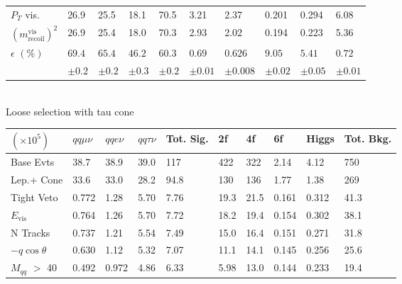 \begin{table}
\begin{tabular}{|p{}|p{}p{}p{}|p{}|p{}p{}p{}p{}|p{}|}
$P_T$ vis. & {26.9 } &  {25.5} &  {18.1} & {70.5} &  {3.21} &  {2.37} &  {0.201} &  {0.294} & 6.08\\ 

$(m^{\text{vis}}_{\text{recoil}})^2$ & {26.9 } &  {25.4 } &  {18.0} & {70.3} &  {2.93} &  {2.02} &  {0.194} &  {0.223} & 5.36 \\ 
\hline 

 $\epsilon \, \, (\%)$ & $69.4 $ & $65.4 $ & $46.2$ &  $60.3 $ & $0.69 $ & $0.626 $ & $9.05 $ & $5.41 $ & $0.72$ \\ 
 
 			& $\pm 0.2$ & $\pm 0.2$ & $\pm 0.3$ & $\pm 0.2$ & $\pm 0.01$ & $\pm 0.008 $& $\pm 0.02$ & $\pm0.05$  & $\pm 0.01$\\
\hline
\end{tabular}
\quad \quad \\
Loose selection with tau cone\\
\begin{tabular}{|p{}|p{}p{}p{}|p{}|p{}p{}p{}p{}|p{}|}
\hline 
 $(\times 10^5)$  & $qq\mu\nu$ & $qqe\nu$ & $qq\tau\nu$ & Tot. Sig. & 2f & 4f & 6f & Higgs & Tot. Bkg. \\ \hline 
Base Evts & {38.7 } &  {38.9 } &  {39.0} & {117} &  {422} &  {322} &  {2.14} &  {4.12} & 750\\ 
 
Lep.+ Cone & {33.6 } &  {33.0 } &  {28.2} & {94.8} &  {130} &  {136} &  {1.77} &  {1.38} & 269\\ 

Tight Veto & {0.772 } &  {1.28 } &  {5.70} & {7.76} &  {19.3} &  {21.5} &  {0.161} &  {0.312} & 41.3 \\ 
 
$E_{\text{vis}}$ & {0.764 } &  {1.26 } &  {5.70} & {7.72} &  {18.2} &  {19.4} &  {0.154} &  {0.302} & 38.1\\ 

N Tracks & {0.737 } &  {1.21 } &  {5.54} & {7.49} &  {15.0} &  {16.4} &  {0.151} &  {0.271} & 31.8\\ 
 
$-q\cos\theta$ & {0.630 } &  {1.12 } &  {5.32} & {7.07} &  {11.1} &  {14.1} &  {0.145} &  {0.256} &25.6\\ 
 
$M_{qq}$ $>$ 40 & {0.492 } &  {0.972 } &  {4.86} & {6.33} &  {5.98} &  {13.0} &  {0.144} &  {0.233}& 19.4 \\ 


\end{tabular}
\end{table}
